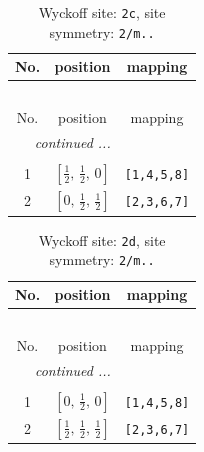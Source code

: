 \documentclass[fleqn,8pt]{jsarticle}
\begin{document}
\renewcommand{\arraystretch}{1.2}
\begin{longtable}{ccc}
\caption{Wyckoff site: {\tt 2c}, site symmetry: {\tt 2/m..}}
 \\
 \hline \hline
No. & position & mapping \\ \hline \endfirsthead

\multicolumn{2}{l}{\tablename\ \thetable{}} \\
 \hline \hline
No. & position & mapping \\ \hline \endhead

 \hline \hline
\multicolumn{2}{r}{\footnotesize\it continued ...} \\ \endfoot

 \hline \hline
\multicolumn{2}{r}{} \\ \endlastfoot

1 & $\left[ \frac{1}{2},\, \frac{1}{2},\, 0 \right]$ & {\tt [1,4,5,8]} \\ \hline
2 & $\left[ 0,\, \frac{1}{2},\, \frac{1}{2} \right]$ & {\tt [2,3,6,7]} \\
\end{longtable}
\renewcommand{\arraystretch}{1.2}
\begin{longtable}{ccc}
\caption{Wyckoff site: {\tt 2d}, site symmetry: {\tt 2/m..}}
 \\
 \hline \hline
No. & position & mapping \\ \hline \endfirsthead

\multicolumn{2}{l}{\tablename\ \thetable{}} \\
 \hline \hline
No. & position & mapping \\ \hline \endhead

 \hline \hline
\multicolumn{2}{r}{\footnotesize\it continued ...} \\ \endfoot

 \hline \hline
\multicolumn{2}{r}{} \\ \endlastfoot

1 & $\left[ 0,\, \frac{1}{2},\, 0 \right]$ & {\tt [1,4,5,8]} \\ \hline
2 & $\left[ \frac{1}{2},\, \frac{1}{2},\, \frac{1}{2} \right]$ & {\tt [2,3,6,7]} \\
\end{longtable}
\renewcommand{\arraystretch}{1.2}
\end{document}
